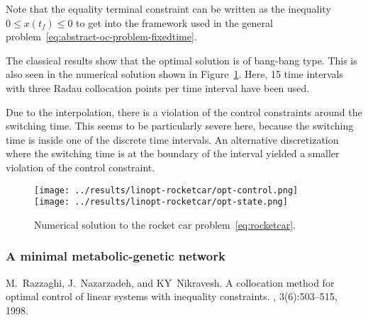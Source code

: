 \documentclass[a4paper,11pt,DIV12]{scrartcl}
\theoremstyle{remark}
\begin{document}
Note that the equality terminal constraint can be written as the inequality $0 \leq x(t_f) \leq 0$ to get into the framework used in the general problem~\eqref{eq:abstract-oc-problem-fixedtime}.

The classical results show that the optimal solution is of bang-bang type.
This is also seen in the numerical solution shown in Figure~\ref{fig:rocketcar}.
Here, 15 time intervals with three Radau collocation points per time interval have been used.

Due to the interpolation, there is a violation of the control constraints around the switching time.
This seems to be particularly severe here, because the switching time is inside one of the discrete time intervals.
An alternative discretization where the switching time is at the boundary of the interval yielded a smaller violation of the control constraint.

\begin{figure}
  \centering
  \texttt{[image: ../results/linopt-rocketcar/opt-control.png]}
  \hspace{1cm}
  \texttt{[image: ../results/linopt-rocketcar/opt-state.png]}  
  \caption{Numerical solution to the rocket car problem~\eqref{eq:rocketcar}.}
  \label{fig:rocketcar}
\end{figure}

\subsubsection{A minimal metabolic-genetic network}
\label{sec:minim-metab-genet}







\begin{thebibliography}{1}

M.~Razzaghi, J.~Nazarzadeh, and KY~Nikravesh.
\newblock A collocation method for optimal control of linear systems with
  inequality constraints.
, 3(6):503--515, 1998.

\end{thebibliography}
\end{document}
